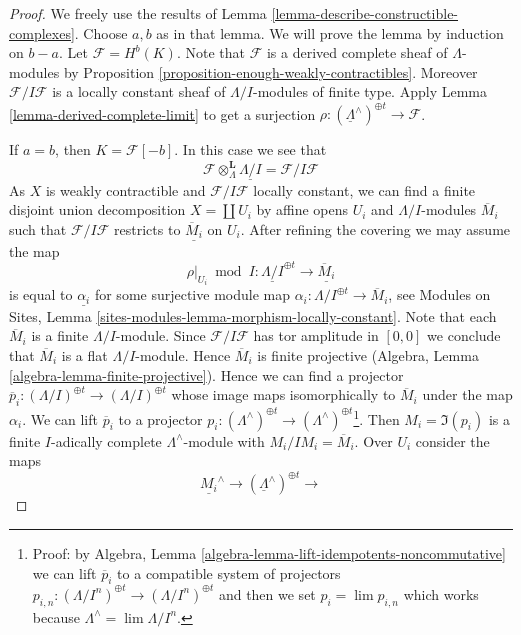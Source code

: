 \begin{proof}
We freely use the results of
Lemma \ref{lemma-describe-constructible-complexes}.
Choose $a, b$ as in that lemma. We will prove the lemma by
induction on $b - a$. Let $\mathcal{F} = H^b(K)$.
Note that $\mathcal{F}$ is a derived complete sheaf of
$\Lambda$-modules by
Proposition \ref{proposition-enough-weakly-contractibles}.
Moreover $\mathcal{F}/I\mathcal{F}$ is a locally
constant sheaf of $\Lambda/I$-modules of finite type.
Apply Lemma \ref{lemma-derived-complete-limit} to get a surjection
$\rho : (\underline{\Lambda}^\wedge)^{\oplus t} \to \mathcal{F}$.

\medskip\noindent
If $a = b$, then $K = \mathcal{F}[-b]$. In this case we see that
$$
\mathcal{F} \otimes_\Lambda^\mathbf{L} \underline{\Lambda/I} =
\mathcal{F}/I\mathcal{F}
$$
As $X$ is weakly contractible and $\mathcal{F}/I\mathcal{F}$
locally constant, we can find a finite disjoint
union decomposition $X = \coprod U_i$ by affine opens $U_i$
and $\Lambda/I$-modules $\overline{M}_i$
such that $\mathcal{F}/I\mathcal{F}$ restricts to
$\underline{\overline{M}_i}$ on $U_i$. After refining the covering
we may assume the map
$$
\rho|_{U_i} \bmod I :
\underline{\Lambda/I}^{\oplus t}
\longrightarrow
\underline{\overline{M}_i}
$$
is equal to $\underline{\alpha_i}$ for some surjective module map
$\alpha_i : \Lambda/I^{\oplus t} \to \overline{M}_i$, see
Modules on Sites, Lemma \ref{sites-modules-lemma-morphism-locally-constant}.
Note that each $\overline{M}_i$ is a finite $\Lambda/I$-module.
Since $\mathcal{F}/I\mathcal{F}$ has tor amplitude in $[0, 0]$
we conclude that $\overline{M}_i$ is a flat $\Lambda/I$-module.
Hence $\overline{M}_i$ is finite projective
(Algebra, Lemma \ref{algebra-lemma-finite-projective}).
Hence we can find a projector
$\overline{p}_i : (\Lambda/I)^{\oplus t} \to (\Lambda/I)^{\oplus t}$
whose image maps isomorphically to $\overline{M}_i$ under the map $\alpha_i$.
We can lift $\overline{p}_i$ to a projector
$p_i : (\Lambda^\wedge)^{\oplus t} \to
(\Lambda^\wedge)^{\oplus t}$\footnote{Proof: by
Algebra, Lemma \ref{algebra-lemma-lift-idempotents-noncommutative}
we can lift $\overline{p}_i$ to a compatible system of
projectors $p_{i, n} : (\Lambda/I^n)^{\oplus t} \to (\Lambda/I^n)^{\oplus t}$
and then we set $p_i = \lim p_{i, n}$ which works because
$\Lambda^\wedge = \lim \Lambda/I^n$.}.
Then $M_i = \Im(p_i)$ is a finite $I$-adically complete
$\Lambda^\wedge$-module with $M_i/IM_i = \overline{M}_i$.
Over $U_i$ consider the maps
$$
\underline{M_i}^\wedge \to
(\underline{\Lambda}^\wedge)^{\oplus t} \to
$$
\end{proof}
